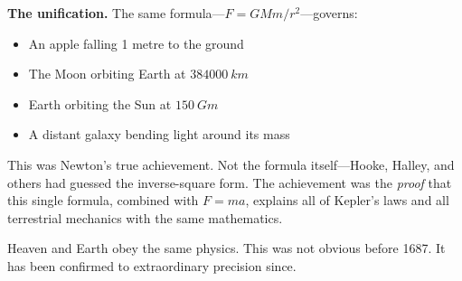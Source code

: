 \documentclass[12pt, a4paper, twoside]{book}
\theoremstyle{disc}
\begin{document}
\begin{discoverybox}
\textbf{The unification.} The same formula---$F = GMm/r^2$---governs:
\begin{itemize}
  \item An apple falling 1 metre to the ground
  \item The Moon orbiting Earth at $\SI{384000}{km}$
  \item Earth orbiting the Sun at $\SI{150}{Gm}$
  \item A distant galaxy bending light around its mass
\end{itemize}

This was Newton's true achievement. Not the formula itself---Hooke, Halley, and others had guessed the inverse-square form. The achievement was the \textit{proof} that this single formula, combined with $F = ma$, explains all of Kepler's laws and all terrestrial mechanics with the same mathematics.

Heaven and Earth obey the same physics. This was not obvious before 1687. It has been confirmed to extraordinary precision since.
\end{discoverybox}

\end{document}
